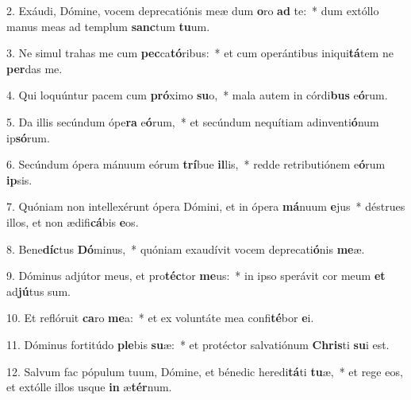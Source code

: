 2. Exáudi, Dómine, vocem deprecatiónis meæ dum \textbf{o}ro \textbf{ad} te:~*  dum extóllo manus meas ad templum \textbf{sanc}tum \textbf{tu}um.\

3. Ne simul trahas me cum \textbf{pec}ca\textbf{tó}ribus:~*  et cum operántibus iniqui\textbf{tá}tem ne \textbf{per}das me.\

4. Qui loquúntur pacem cum \textbf{pró}ximo \textbf{su}o,~*  mala autem in córdi\textbf{bus} e\textbf{ó}rum.\

5. Da illis secúndum ópe\textbf{ra} e\textbf{ó}rum,~*  et secúndum nequítiam adinventi\textbf{ó}num ip\textbf{só}rum.\

6. Secúndum ópera mánuum eórum \textbf{trí}bue \textbf{il}lis,~*  redde retributiónem e\textbf{ó}rum \textbf{ip}sis.\

7. Quóniam non intellexérunt ópera Dómini, et in ópera \textbf{má}nuum \textbf{e}jus~*  déstrues illos, et non ædifi\textbf{cá}bis \textbf{e}os.\

8. Bene\textbf{díc}tus \textbf{Dó}minus,~*  quóniam exaudívit vocem deprecati\textbf{ó}nis \textbf{me}æ.\

9. Dóminus adjútor meus, et pro\textbf{téc}tor \textbf{me}us:~*  in ipso sperávit cor meum \textbf{et} ad\textbf{jú}tus sum.\

10. Et reflóruit \textbf{ca}ro \textbf{me}a:~*  et ex voluntáte mea confi\textbf{té}bor \textbf{e}i.\

11. Dóminus fortitúdo \textbf{ple}bis \textbf{su}æ:~*  et protéctor salvatiónum \textbf{Chris}ti \textbf{su}i est.\

12. Salvum fac pópulum tuum, Dómine, et bénedic heredi\textbf{tá}ti \textbf{tu}æ,~*  et rege eos, et extólle illos usque \textbf{in} æ\textbf{tér}num.\

